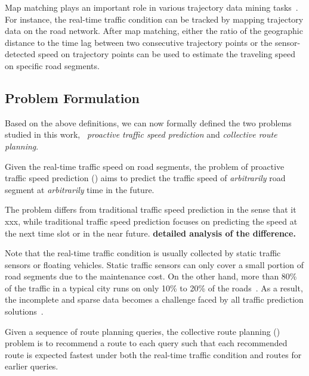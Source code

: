 Map matching plays an important role in various trajectory data mining tasks~\cite{Zheng2015TDM}. For instance, the real-time traffic condition can be tracked by mapping trajectory data on the road network. After map matching, either the ratio of the geographic distance to the time lag between two consecutive trajectory points or the sensor-detected speed on trajectory points can be used to estimate the traveling speed on specific road segments.


\subsection{Problem Formulation}
\label{subsec-problem}

Based on the above definitions, we can now formally defined the two problems studied in this work,  \ie~{\em proactive traffic speed prediction} and {\em collective route planning}.

\begin{definition}Given the real-time traffic speed on road segments, the problem of proactive traffic speed prediction (\ptsp) aims to predict the traffic speed of {\em arbitrarily} road segment at {\em arbitrarily} time in the future. %
\end{definition}

The \ptsp problem differs from traditional traffic speed prediction in the sense that it xxx, while traditional traffic speed prediction focuses on predicting the speed at the next time slot or in the near future. {\bf detailed analysis of the difference.}

Note that the real-time traffic condition is usually collected by static traffic sensors or floating vehicles. Static traffic sensors can only cover a small portion of road segments due to the maintenance cost. On the other hand, more than 80\% of the traffic in a typical city runs on only 10\% to 20\% of the roads~\cite{WuMSZZCWKDD16}. As a result, the incomplete and sparse data becomes a challenge faced by all traffic prediction solutions~\cite{Zhu2013TMC,Shang2014KDD,Lu2017Speed}.


\begin{definition} Given a sequence of route planning queries, the collective route planning (\crp) problem is to recommend a route to each query such that each recommended route is expected fastest under both the real-time traffic condition and routes for earlier queries.
\end{definition}

